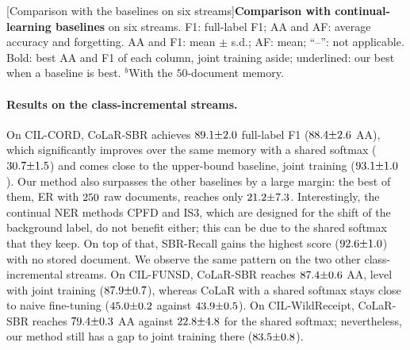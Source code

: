\begin{landscape}
  \centering
  [Comparison with the baselines on six streams]{\textbf{Comparison with
  continual-learning baselines} on six streams. F1: full-label F1; AA and AF: average
  accuracy and forgetting. AA and F1: mean $\pm$ s.d.; AF: mean; ``--'': not applicable.
  Bold: best AA and F1 of each column, joint training aside; underlined: our best when a
  baseline is best. $^{b}$With the $50$-document memory.}
  \label{tab:main}
  \par\vspace{6pt}
  \resizebox{\linewidth}{!}{}
\end{landscape}

\paragraph{Results on the class-incremental streams.} On CIL-CORD, CoLaR-SBR achieves
$89.1{\pm}2.0$ full-label F1 ($88.4{\pm}2.6$ AA), which significantly improves over the same memory
with a shared softmax ($30.7{\pm}1.5$) and comes close to the upper-bound baseline, joint
training ($93.1{\pm}1.0$). Our method also surpasses the other baselines by a large margin:
the best of them, ER with $250$ raw documents, reaches only $21.2{\pm}7.3$.
Interestingly, the continual NER methods CPFD and IS3, which are designed for the shift of
the background label, do not benefit either; this can be due to the shared softmax that
they keep. On top of that, SBR-Recall gains the highest
score ($92.6{\pm}1.0$) with no stored document. We observe the same pattern on the two
other class-incremental streams. On CIL-FUNSD, CoLaR-SBR reaches $87.4{\pm}0.6$ AA, level
with joint training ($87.9{\pm}0.7$), whereas CoLaR with a shared softmax stays close to
naive fine-tuning ($45.0{\pm}0.2$ against $43.9{\pm}0.5$). On CIL-WildReceipt, CoLaR-SBR
reaches $79.4{\pm}0.3$ AA against $22.8{\pm}4.8$ for the shared softmax; nevertheless, our
method still has a gap to joint training there ($83.5{\pm}0.8$).

